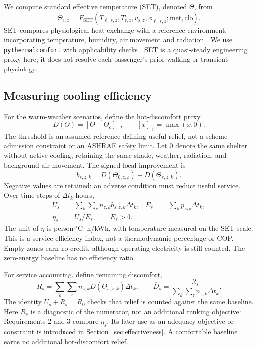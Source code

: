 \documentclass[12pt]{article}
\begin{document}
We compute standard effective temperature (SET), denoted $\Theta$, from
\begin{equation}
 \Theta_{s,z}=F_{\mathrm{SET}}(T_{\ell,s,z},T_{r,z},v_{s,z},\phi_{\ell,s,z};\mathrm{met},\mathrm{clo}).
\label{eq:set}
\end{equation}
SET compares physiological heat exchange with a reference environment, incorporating temperature, humidity, air movement and radiation \cite{thermalcomfort,fanguide}. We use \texttt{pythermalcomfort} with applicability checks \cite{pythermal}. SET is a quasi-steady engineering proxy here; it does not resolve each passenger's prior walking or transient physiology.

\subsection{Measuring cooling efficiency}

For the warm-weather scenarios, define the hot-discomfort proxy
\begin{equation}
 D(\Theta)=[\Theta-\Theta_c]_+,\qquad [x]_+=\max(x,0).
\end{equation}
The threshold is an assumed reference defining useful relief, not a scheme-admission constraint or an ASHRAE safety limit. Let $0$ denote the same shelter without active cooling, retaining the same shade, weather, radiation, and background air movement. The signed local improvement is
\begin{equation}
 b_{s,z,k}=D(\Theta_{0,z,k})-D(\Theta_{s,z,k}).
\end{equation}
Negative values are retained: an adverse condition must reduce useful service. Over time steps of $\Delta t_k$ hours,
\begin{align}
 U_s&=\sum_k\sum_z n_{z,k}b_{s,z,k}\Delta t_k, &
 E_s&=\sum_k p_{s,k}\Delta t_k,\\
 \eta_s&=U_s/E_s,\qquad E_s>0.
\label{eq:bus-efficiency}
\end{align}
The unit of $\eta$ is person$\cdot{}^{\circ}\mathrm C\cdot$h/kWh, with temperature measured on the SET scale. This is a service-efficiency index, not a thermodynamic percentage or COP. Empty zones earn no credit, although operating electricity is still counted. The zero-energy baseline has no efficiency ratio.

For service accounting, define remaining discomfort,
\begin{equation}
 R_s=\sum_k\sum_z n_{z,k}D(\Theta_{s,z,k})\Delta t_k,
 \qquad \overline D_s=\frac{R_s}{\sum_k\sum_z n_{z,k}\Delta t_k}.
\label{eq:remaining}
\end{equation}
The identity $U_s+R_s=R_0$ checks that relief is counted against the same baseline. Here $R_s$ is a diagnostic of the numerator, not an additional ranking objective: Requirements 2 and 3 compare $\eta_s$. Its later use as an adequacy objective or constraint is introduced in Section~\ref{sec:effectiveness}. A comfortable baseline earns no additional hot-discomfort relief.
\end{document}
